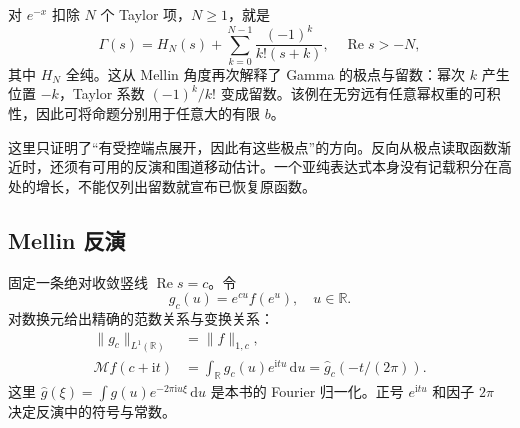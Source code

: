 对 \(e^{-x}\) 扣除 \(N\) 个 Taylor 项，\(N\ge1\)，就是
\[
 \Gamma(s)=H_N(s)+\sum_{k=0}^{N-1}\frac{(-1)^k}{k!(s+k)},
 \quad \operatorname{Re}s>-N,
\]
其中 \(H_N\) 全纯。这从 Mellin 角度再次解释了 Gamma 的极点与留数：幂次 \(k\) 产生位置 \(-k\)，Taylor 系数 \((-1)^k/k!\) 变成留数。该例在无穷远有任意幂权重的可积性，因此可将命题分别用于任意大的有限 \(b\)。

\ProseParagraphBreak

这里只证明了“有受控端点展开，因此有这些极点”的方向。反向从极点读取函数渐近时，还须有可用的反演和围道移动估计。一个亚纯表达式本身没有记载积分在高处的增长，不能仅列出留数就宣布已恢复原函数。

\subsection{Mellin 反演}
\label{b3:subsec:210504}

固定一条绝对收敛竖线 \(\operatorname{Re}s=c\)。令
\[
 g_c(u)=e^{cu}f(e^u),\quad u\in\mathbb R.
\]
对数换元给出精确的范数关系与变换关系：
\begin{equation}\label{b3:eq:21-mellin-fourier}
 \begin{aligned}
 \|g_c\|_{L^1(\mathbb R)}&=\|f\|_{1,c},\\
 \mathcal Mf(c+\mathrm it)&=\int_{\mathbb R}g_c(u)e^{\mathrm itu}\,\mathrm du
                         =\widehat g_c(-t/(2\pi)).
 \end{aligned}
\end{equation}
这里 \(\widehat g(\xi)=\int g(u)e^{-2\pi\mathrm iu\xi}\,\mathrm du\) 是本书的 Fourier 归一化。正号 \(e^{\mathrm itu}\) 和因子 \(2\pi\) 决定反演中的符号与常数。

